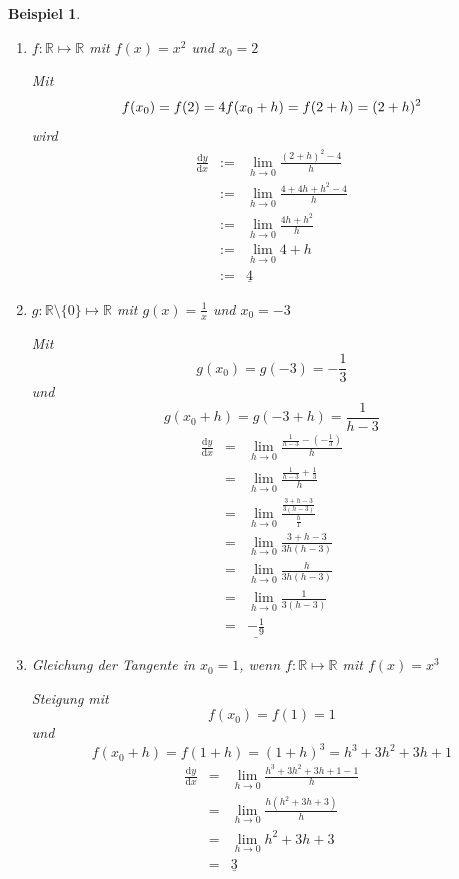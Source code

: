 \documentclass{report}
\newtheorem{myexample}{Beispiel}
\begin{document}
\begin{myexample}\begin{enumerate}
\item $ f:\mathbb{R} \mapsto \mathbb{R}$ mit $f(x) = x^2$ und $x_0 = 2$

Mit \begin{equation} f(x_0) = f(2) = 4 \\ f(x_0 + h) = f(2 + h) = (2+h)^2 \end{equation}
wird \begin{eqnarray} \frac{\mathrm{d}y}{\mathrm{d}x} & := & \lim_{h \to 0} \frac{(2+h)^2 - 4}{h} \\
 & := & \lim_{h \to 0}  \frac{4 + 4h + h^2 - 4}{h} \\
 & := & \lim_{h \to 0}  \frac{4h + h^2}{h} \\
 & := & \lim_{h \to 0} 4 + h \\
 & := & \underline{4} \end{eqnarray}
\item $ g:\mathbb{R} \setminus \{0\} \mapsto \mathbb{R}$ mit $g(x) = \frac{1}{x}$ und $x_0 = -3$

Mit \begin{equation} g(x_0) = g(-3) = -\frac{1}{3} \end{equation}
und \begin{equation} g(x_0 + h) = g(-3 + h) = \frac{1}{h-3} \end{equation}
\begin{eqnarray}
 \frac{\mathrm{d}y}{\mathrm{d}x} & = & \lim_{h \to 0} \frac{\frac{1}{h-3} - (-\frac{1}{3})}{h} \\
 & = & \lim_{h \to 0} \frac{\frac{1}{h-3} +\frac{1}{3}}{h} \\
 & = & \lim_{h \to 0}  \frac{\frac{3 + h-3}{3(h-3)}}{\frac{h}{1}} \\
 & = & \lim_{h \to 0} \frac{3+h-3}{3h(h-3)} \\
 & = & \lim_{h \to 0} \frac{h}{3h(h-3)} \\
 & = & \lim_{h \to 0} \frac{1}{3(h-3)} \\
 & = & \underline{-\frac{1}{9}} \end{eqnarray}
\item Gleichung der Tangente in $x_0 = 1$, wenn $ f:\mathbb{R} \mapsto \mathbb{R}$ mit $ f(x) = x^3$

Steigung mit \begin{equation} f(x_0) = f(1) = 1 \end{equation}
und \begin{equation} f(x_0 + h) = f(1 + h) = (1 + h)^3 = h^3 + 3h^2 + 3h + 1\end{equation}
\begin{eqnarray}
 \frac{\mathrm{d}y}{\mathrm{d}x} & = & \lim_{h \to 0} \frac{h^3 + 3h^2 + 3h + 1 - 1}{h} \\
 & = & \lim_{h \to 0} \frac{h(h^2 + 3h + 3)}{h} \\
 & = & \lim_{h \to 0} h^2 + 3h + 3 \\
 & = & \underline{3} \end{eqnarray}
\end{enumerate}\end{myexample}
\end{document}
